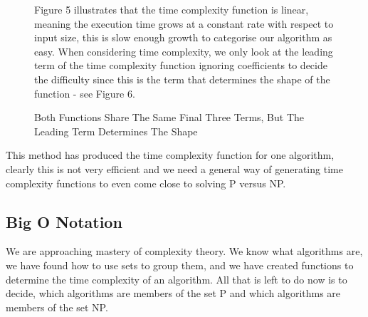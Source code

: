\documentclass[twoside,10pt]{article}
\begin{document}
\begin{figure}[H]
Figure 5 illustrates that the time complexity function is linear, meaning the execution time grows at a constant rate with respect to input size, this is slow enough growth to categorise our algorithm as easy. When considering time complexity, we only look at the leading term of the time complexity function ignoring coefficients to decide the difficulty since this is the term that determines the shape of the function - see Figure 6.

\caption{Both Functions Share The Same Final Three Terms, But The Leading Term Determines The Shape}
\label{fig:shapegraph}
\end{figure}
\vspace{-20pt}
This method has produced the time complexity function for one algorithm, clearly this is not very efficient and we need a general way of generating time complexity functions to even come close to solving P versus NP. 
\vspace{-20pt}
\subsection{Big O Notation}
We are approaching mastery of complexity theory. We know what algorithms are, we have found how to use sets to group them, and we have created functions to determine the time complexity of an algorithm. All that is left to do now is to decide, which algorithms are members of the set P and which algorithms are members of the set NP.
\end{document}
